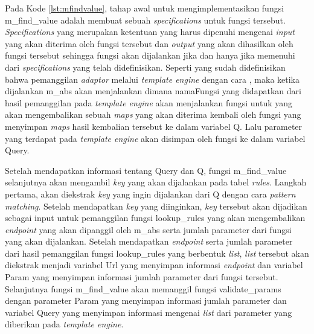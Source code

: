 Pada Kode \ref{lst:mfindvalue}, tahap awal untuk mengimplementasikan fungsi m\_find\_value adalah membuat sebuah \textit{specifications} untuk fungsi tersebut. \textit{Specifications} yang merupakan ketentuan yang harus dipenuhi mengenai \textit{input} yang akan diterima oleh fungsi tersebut dan \textit{output} yang akan dihasilkan oleh fungsi tersebut sehingga fungsi akan dijalankan jika dan hanya jika memenuhi dari \textit{specifications} yang telah didefinisikan. Seperti yang sudah didefinisikan bahwa pemanggilan \textit{adaptor} melalui \textit{template engine} dengan cara , maka ketika dijalankan m\_abs akan menjalankan  dimana namaFungsi yang didapatkan dari hasil pemanggilan pada \textit{template engine} akan menjalankan fungsi  untuk yang akan mengembalikan sebuah \textit{maps} yang akan diterima kembali oleh fungsi  yang menyimpan \textit{maps} hasil kembalian tersebut ke dalam variabel Q. Lalu parameter yang terdapat pada \textit{template engine} akan disimpan oleh fungsi  ke dalam variabel Query.

Setelah mendapatkan informasi tentang Query dan Q, fungsi m\_find\_value selanjutnya akan mengambil \textit{key} yang akan dijalankan pada tabel \textit{rules}. Langkah pertama, akan diekstrak \textit{key} yang ingin dijalankan dari Q dengan cara \textit{pattern matching}. Setelah mendapatkan \textit{key} yang diinginkan, \textit{key} tersebut akan dijadikan sebagai input untuk pemanggilan fungsi lookup\_rules yang akan mengembalikan \textit{endpoint} yang akan dipanggil oleh m\_abs serta jumlah parameter dari fungsi yang akan dijalankan. Setelah mendapatkan \textit{endpoint} serta jumlah parameter dari hasil pemanggilan fungsi lookup\_rules yang berbentuk \textit{list}, \textit{list} tersebut akan diekstrak menjadi variabel Url yang menyimpan informasi \textit{endpoint} dan variabel Param yang menyimpan informasi jumlah parameter dari fungsi tersebut. Selanjutnya fungsi m\_find\_value akan memanggil fungsi validate\_params dengan parameter Param yang menyimpan informasi jumlah parameter dan variabel Query yang menyimpan informasi mengenai \textit{list} dari parameter yang diberikan pada \textit{template engine}.

